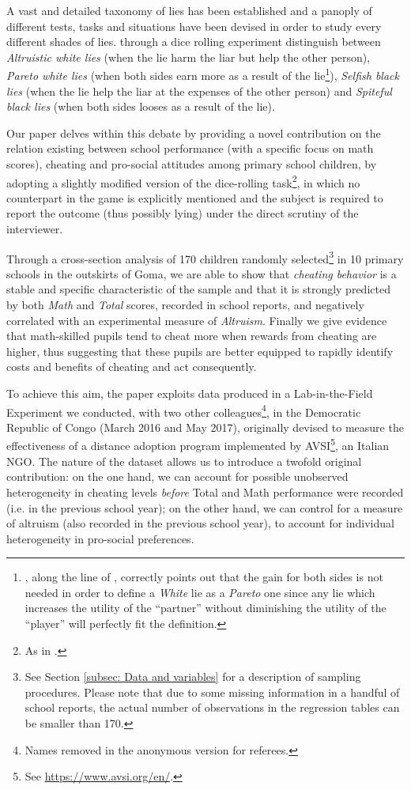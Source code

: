 \documentclass[authoryear, preprint, review, 12pt]{elsarticle}
\begin{document}
A vast and detailed taxonomy of lies has been established and a panoply of different tests, tasks and situations have been devised in order to study every different shades of lies.\cite{erat2012white} through a dice rolling experiment distinguish between \textit{Altruistic white lies} (when the lie harm the liar but help the other person), \textit{Pareto white lies} (when both sides earn more as a result of the lie\footnote{\cite{maggian2016social}, along the line of \cite{g05}, correctly points out that the gain for both sides is not needed in order to define a \textit{White} lie as a \textit{Pareto} one since any lie which increases the utility of the \enquote{partner} without diminishing the utility of the \enquote{player} will perfectly fit the definition.}), \textit{Selfish black lies} (when the lie help the liar at the expenses of the other person) and \textit{Spiteful black lies} (when both sides looses as a result of the lie).

Our paper delves within this debate by providing a novel contribution on the relation existing between school performance (with a specific focus on math scores), cheating and pro-social attitudes among primary school children, by adopting a slightly modified version of the dice-rolling task\footnote{As in \cite{ariely2015true}.}, in which no counterpart in the game is explicitly mentioned and the subject is required to report the outcome (thus possibly lying) under the direct scrutiny of the interviewer. 

Through a cross-section analysis of 170 children randomly selected\footnote{See Section \ref{subsec: Data and variables} for a description of sampling procedures. Please note that due to some missing information in a handful of school reports, the actual number of observations in the regression tables can be smaller than 170.} in 10 primary schools in the outskirts of Goma, we are able to show that \textit{cheating behavior} is a stable and specific characteristic of the sample and that it is strongly predicted by both \textit{Math} and \textit{Total} scores, recorded in school reports, and negatively correlated with an experimental measure of \textit{Altruism}. Finally we give evidence that math-skilled pupils tend to cheat more when rewards from cheating are higher, thus suggesting that these pupils are better equipped to rapidly identify costs and benefits of cheating and act consequently.

To achieve this aim, the paper exploits data produced in a Lab-in-the-Field Experiment we conducted, with two other colleagues\footnote{Names removed in the anonymous version for referees.}, in the Democratic Republic of Congo (March 2016 and May 2017), originally devised to measure the effectiveness of a distance adoption program implemented by AVSI\footnote{See \url{https://www.avsi.org/en/}.}, an Italian NGO. The nature of the dataset allows us to introduce a twofold original contribution: on the one hand, we can account for possible unobserved heterogeneity in cheating levels \textit{before} Total and Math performance were recorded (i.e. in the previous school year); on the other hand, we can control for a measure of altruism (also recorded in the previous school year), to account for individual heterogeneity in pro-social preferences.
\end{document}
